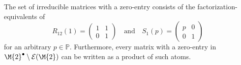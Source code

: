 \begin{proposition}\label{prop:2x2-upper-triangular}
The set of irreducible matrices with a zero-entry consists of the factorization-equivalents of
\[ R_{12}(1) = \begin{pmatrix} 1 & 1 \\ 0 & 1 \end{pmatrix} \quad \text{and} \quad S_1(p) = \begin{pmatrix} p & 0 \\ 0 & 1 \end{pmatrix} \]
for an arbitrary $p \in \mathbb{P}$. Furthermore, every matrix with a zero-entry in ${\M{2}}^\bullet\setminus\mathcal{E}(\M{2})$ can be written as a product of such atoms.
\end{proposition}


